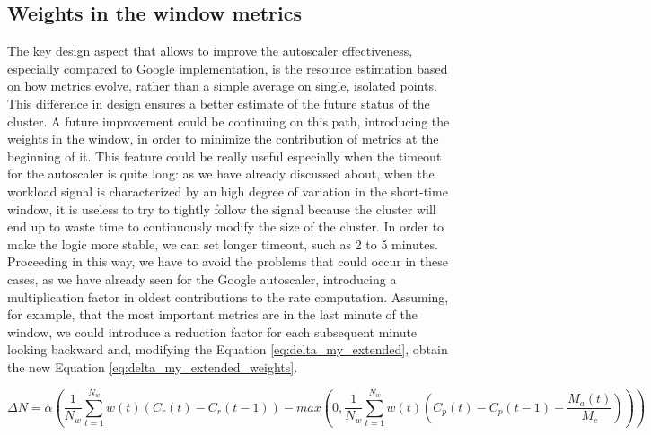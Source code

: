 \documentclass[12pt,twoside,cucitura]{toptesi}
\begin{document}
\subsection{Weights in the window metrics}
The key design aspect that allows to improve the autoscaler effectiveness, especially compared to Google implementation, is the resource estimation based on how metrics evolve, rather than a simple average on single, isolated points. This difference in design ensures a better estimate of the future status of the cluster. A future improvement could be continuing on this path, introducing the weights in the window, in order to minimize the contribution of metrics at the beginning of it. This feature could be really useful especially when the timeout for the autoscaler is quite long: as we have already discussed about, when the workload signal is characterized by an high degree of variation in the short-time window, it is useless to try to tightly follow the signal because the cluster will end up to waste time to continuously modify the size of the cluster. In order to make the logic more stable, we can set longer timeout, such as 2 to 5 minutes. Proceeding in this way, we have to avoid the problems that could occur in these cases, as we have already seen for the Google autoscaler, introducing a multiplication factor in oldest contributions to the rate computation. Assuming, for example, that the most important metrics are in the last minute of the window, we could introduce a reduction factor for each subsequent minute looking backward and, modifying the Equation \ref{eq:delta_my_extended}, obtain the new Equation \ref{eq:delta_my_extended_weights}.

\begin{equation} \label{eq:delta_my_extended_weights}
\Delta N = \alpha(\frac{1}{N_{w} }\sum_{t = 1}^{N_{w} }w(t)(C_{r}(t)-C_{r}(t-1)) - max(0,\frac{1}{N_{w} }\sum_{t = 1}^{N_{w} }w(t)(C_{p}(t)-C_{p}(t-1)-\frac{M_{a}(t)}{M_{c}})))
\end{equation}
\end{document}
